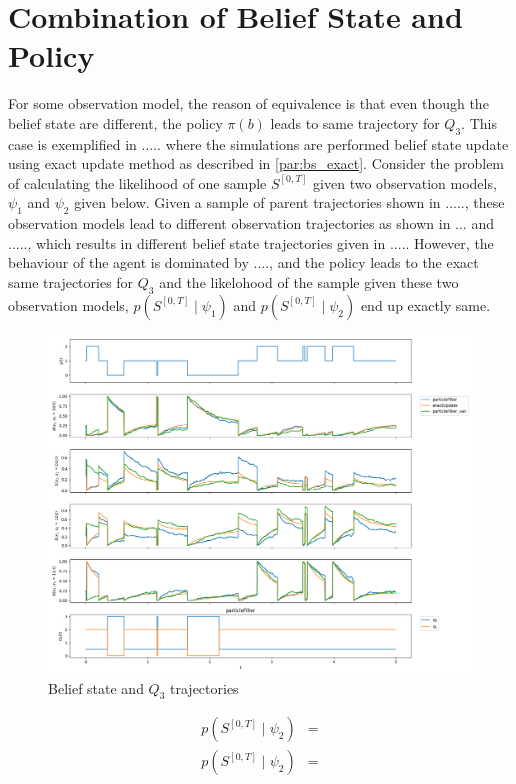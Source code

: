 \section*{Combination of Belief State and Policy}
For some observation model, the reason of equivalence is that even though the belief state are different, the policy $ \pi(b) $ leads to same trajectory for $ Q_3 $. This case is exemplified in ..... where the simulations are performed belief state update using exact update method as described in \cref{par:bs_exact}. Consider the problem of calculating the likelihood of one sample $ S^{[0,T]} $ given two observation models, $ \psi_1 $ and $ \psi_2 $ given below. Given a sample of parent trajectories shown in .....,  these observation models lead to different observation trajectories as shown in ... and ....., which results in different belief state trajectories given in ..... However, the behaviour of the agent is dominated by ...., and the policy leads to the exact same trajectories for $ Q_3 $ and the likelohood of the sample given these two observation models, $ p(S^{[0,T]} \mid \psi_1 ) $ and $ p(S^{[0,T]} \mid \psi_2 ) $ end up exactly same. %
\begin{figure}[H]
	\begin{center}
		\includegraphics[width=.60\textwidth]{figures/b_q_traj}
		\caption{Belief state and $ Q_3 $ trajectories}
		\label{fig:b_q_traj}
	\end{center}
\end{figure}
\begin{align}
p(S^{[0,T]} \mid \psi_2 ) &= \\
p(S^{[0,T]} \mid \psi_2 ) &=
\label{eq:integral}
\end{align}
